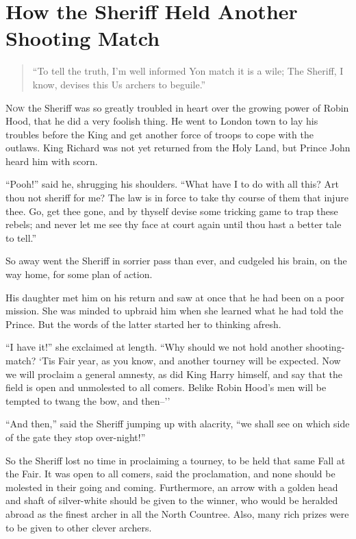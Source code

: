 \chapter{How the Sheriff Held Another Shooting Match}

\begin{quote}
“To tell the truth, I’m well informed
Yon match it is a wile;
The Sheriff, I know, devises this
Us archers to beguile.”
\end{quote}

\lettrine{N}{ow} the Sheriff was so greatly troubled in heart over the growing power
of Robin Hood, that he did a very foolish thing. He went to London town
to lay his troubles before the King and get another force of troops to
cope with the outlaws. King Richard was not yet returned from the Holy
Land, but Prince John heard him with scorn.

``Pooh!'' said he, shrugging his shoulders. ``What have I to do with all
this? Art thou not sheriff for me? The law is in force to take thy
course of them that injure thee. Go, get thee gone, and by thyself
devise some tricking game to trap these rebels; and never let me see thy
face at court again until thou hast a better tale to tell.''

So away went the Sheriff in sorrier pass than ever, and cudgeled his
brain, on the way home, for some plan of action.

His daughter met him on his return and saw at once that he had been on a
poor mission. She was minded to upbraid him when she learned what he had
told the Prince. But the words of the latter started her to thinking
afresh.

``I have it!'' she exclaimed at length. ``Why should we not hold another
shooting-match? `Tis Fair year, as you know, and another tourney will be
expected. Now we will proclaim a general amnesty, as did King Harry
himself, and say that the field is open and unmolested to all comers.
Belike Robin Hood's men will be tempted to twang the bow, and then--''

``And then,'' said the Sheriff jumping up with alacrity, ``we shall see
on which side of the gate they stop over-night!''

So the Sheriff lost no time in proclaiming a tourney, to be held that
same Fall at the Fair. It was open to all comers, said the proclamation,
and none should be molested in their going and coming. Furthermore, an
arrow with a golden head and shaft of silver-white should be given to
the winner, who would be heralded abroad as the finest archer in all the
North Countree. Also, many rich prizes were to be given to other clever
archers.

